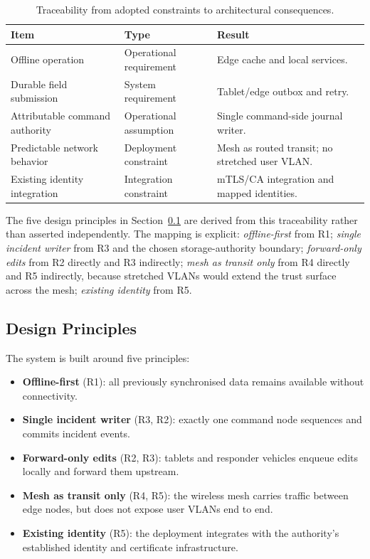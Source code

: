 \begin{table}[t]
\centering
\caption{Traceability from adopted constraints to architectural consequences.}
\label{tab:req-trace}
\footnotesize
\begin{tabularx}{\columnwidth}{@{}l l X@{}}
\toprule
\textbf{Item} & \textbf{Type} & \textbf{Result} \\
\midrule
Offline operation & Operational requirement & Edge cache and local services. \\
Durable field submission & System requirement & Tablet/edge outbox and retry. \\
Attributable command authority & Operational assumption & Single command-side journal writer. \\
Predictable network behavior & Deployment constraint & Mesh as routed transit; no stretched user VLAN. \\
Existing identity integration & Integration constraint & mTLS/CA integration and mapped identities. \\
\bottomrule
\end{tabularx}
\end{table}

The five design principles in Section~\ref{sec:principles} are derived from this traceability rather than asserted independently. The mapping is explicit: \textit{offline-first} from R1; \textit{single incident writer} from R3 and the chosen storage-authority boundary; \textit{forward-only edits} from R2 directly and R3 indirectly; \textit{mesh as transit only} from R4 directly and R5 indirectly, because stretched VLANs would extend the trust surface across the mesh; \textit{existing identity} from R5.

\subsection{Design Principles}
\label{sec:principles}

The system is built around five principles:
\begin{itemize}
  \item \textbf{Offline-first} (R1): all previously synchronised data remains available without connectivity.
  \item \textbf{Single incident writer} (R3, R2): exactly one command node sequences and commits incident events.
  \item \textbf{Forward-only edits} (R2, R3): tablets and responder vehicles enqueue edits locally and forward them upstream.
  \item \textbf{Mesh as transit only} (R4, R5): the wireless mesh carries traffic between edge nodes, but does not expose user VLANs end to end.
  \item \textbf{Existing identity} (R5): the deployment integrates with the authority's established identity and certificate infrastructure.
\end{itemize}

